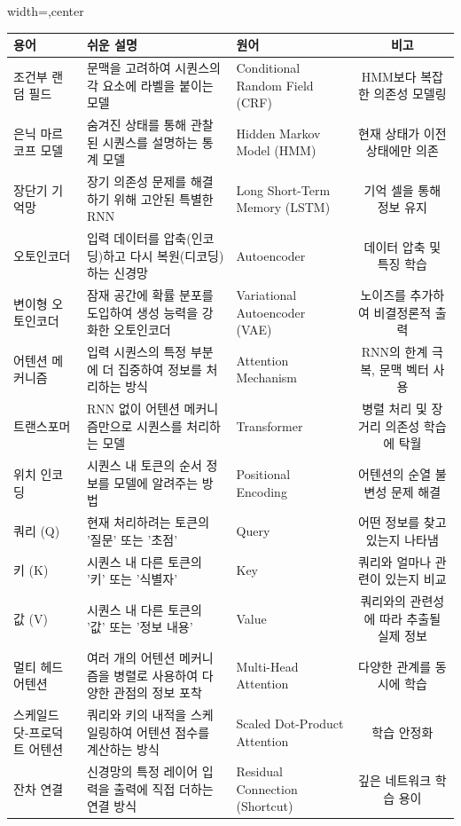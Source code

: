 \documentclass[11pt,a4paper]{article}
\theoremstyle{definition}
\begin{document}
\begin{adjustbox}{width=\textwidth,center}
\begin{tabular}{lllc}
\toprule
\textbf{용어} & \textbf{쉬운 설명} & \textbf{원어} & \textbf{비고} \\
\midrule
조건부 랜덤 필드 & 문맥을 고려하여 시퀀스의 각 요소에 라벨을 붙이는 모델 & Conditional Random Field (CRF) & HMM보다 복잡한 의존성 모델링 \\
은닉 마르코프 모델 & 숨겨진 상태를 통해 관찰된 시퀀스를 설명하는 통계 모델 & Hidden Markov Model (HMM) & 현재 상태가 이전 상태에만 의존 \\
장단기 기억망 & 장기 의존성 문제를 해결하기 위해 고안된 특별한 RNN & Long Short-Term Memory (LSTM) & 기억 셀을 통해 정보 유지 \\
오토인코더 & 입력 데이터를 압축(인코딩)하고 다시 복원(디코딩)하는 신경망 & Autoencoder & 데이터 압축 및 특징 학습 \\
변이형 오토인코더 & 잠재 공간에 확률 분포를 도입하여 생성 능력을 강화한 오토인코더 & Variational Autoencoder (VAE) & 노이즈를 추가하여 비결정론적 출력 \\
어텐션 메커니즘 & 입력 시퀀스의 특정 부분에 더 집중하여 정보를 처리하는 방식 & Attention Mechanism & RNN의 한계 극복, 문맥 벡터 사용 \\
트랜스포머 & RNN 없이 어텐션 메커니즘만으로 시퀀스를 처리하는 모델 & Transformer & 병렬 처리 및 장거리 의존성 학습에 탁월 \\
위치 인코딩 & 시퀀스 내 토큰의 순서 정보를 모델에 알려주는 방법 & Positional Encoding & 어텐션의 순열 불변성 문제 해결 \\
쿼리 (Q) & 현재 처리하려는 토큰의 '질문' 또는 '초점' & Query & 어떤 정보를 찾고 있는지 나타냄 \\
키 (K) & 시퀀스 내 다른 토큰의 '키' 또는 '식별자' & Key & 쿼리와 얼마나 관련이 있는지 비교 \\
값 (V) & 시퀀스 내 다른 토큰의 '값' 또는 '정보 내용' & Value & 쿼리와의 관련성에 따라 추출될 실제 정보 \\
멀티 헤드 어텐션 & 여러 개의 어텐션 메커니즘을 병렬로 사용하여 다양한 관점의 정보 포착 & Multi-Head Attention & 다양한 관계를 동시에 학습 \\
스케일드 닷-프로덕트 어텐션 & 쿼리와 키의 내적을 스케일링하여 어텐션 점수를 계산하는 방식 & Scaled Dot-Product Attention & 학습 안정화 \\
잔차 연결 & 신경망의 특정 레이어 입력을 출력에 직접 더하는 연결 방식 & Residual Connection (Shortcut) & 깊은 네트워크 학습 용이 \\

\end{tabular}
\end{adjustbox}
\end{document}
